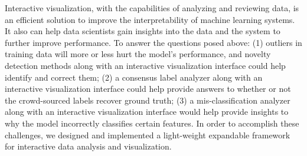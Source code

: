 Interactive visualization, with the capabilities of analyzing and reviewing data, 
is an efficient solution to improve the interpretability of machine learning 
systems. It also can help data scientists gain insights into the data and the 
system to further improve performance. To answer the questions posed above: 
(1) outliers in training data will more or less hurt the model's performance, 
and novelty detection methods along with an interactive visualization interface 
could help identify and correct them; (2) a consensus label analyzer along with 
an interactive visualization interface could help provide answers to whether or 
not the crowd-sourced labels recover ground truth; (3) a mis-classification 
analyzer along with an interactive visualization interface would help provide 
insights to why the model incorrectly classifies certain features. In order to 
accomplish these challenges, we designed and implemented a light-weight 
expandable framework for interactive data analysis and visualization. 
